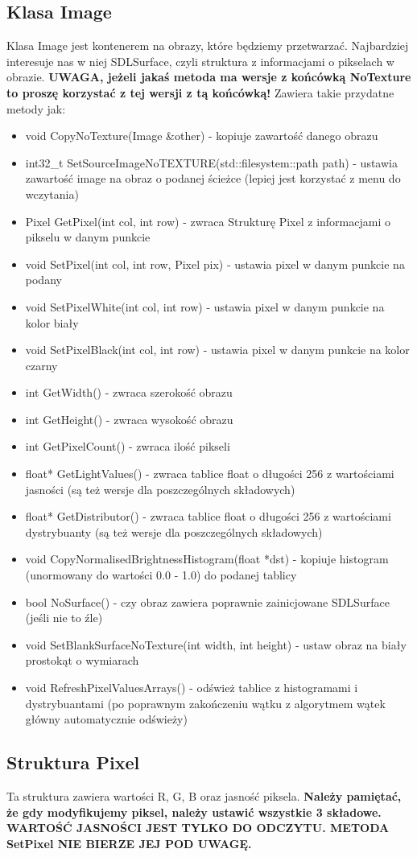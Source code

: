 \documentclass{article}
\begin{document}
\subsection{Klasa Image}
Klasa Image jest kontenerem na obrazy, które będziemy przetwarzać.
\newline
Najbardziej interesuje nas w niej SDLSurface, czyli struktura z informacjami o pikselach w obrazie.
\newline
\textbf{UWAGA, jeżeli jakaś metoda ma wersje z końcówką NoTexture to proszę korzystać z tej wersji z tą końcówką!}
\newline
Zawiera takie przydatne metody jak:
\begin{itemize}
    \item void CopyNoTexture(Image \&other) - kopiuje zawartość danego obrazu
    \item int32\_t SetSourceImageNoTEXTURE(std::filesystem::path path) - ustawia zawartość image na obraz o podanej ścieżce (lepiej jest korzystać z menu do wczytania)
    \item Pixel GetPixel(int col, int row) - zwraca Strukturę Pixel z informacjami o pikselu w danym punkcie
    \item void SetPixel(int col, int row, Pixel pix) - ustawia pixel w danym punkcie na podany
    \item void SetPixelWhite(int col, int row) - ustawia pixel w danym punkcie na kolor biały
    \item void SetPixelBlack(int col, int row) - ustawia pixel w danym punkcie na kolor czarny
    \item int GetWidth() - zwraca szerokość obrazu
    \item int GetHeight() - zwraca wysokość obrazu
    \item int GetPixelCount() - zwraca ilość pikseli
    \item float* GetLightValues() - zwraca tablice float o długości 256 z wartościami jasności (są też wersje dla poszczególnych składowych)
    \item float* GetDistributor() - zwraca tablice float o długości 256 z wartościami dystrybuanty (są też wersje dla poszczególnych składowych)
    \item void CopyNormalisedBrightnessHistogram(float *dst) - kopiuje histogram (unormowany do wartości 0.0 - 1.0) do podanej tablicy
    \item bool NoSurface() - czy obraz zawiera poprawnie zainicjowane SDLSurface (jeśli nie to źle)
    \item void SetBlankSurfaceNoTexture(int width, int height) - ustaw obraz na biały prostokąt o wymiarach
    \item void RefreshPixelValuesArrays() - odśwież tablice z histogramami i dystrybuantami (po poprawnym zakończeniu wątku z algorytmem wątek główny automatycznie odświeży)

\end{itemize}

\subsection{Struktura Pixel}
Ta struktura zawiera wartości R, G, B oraz jasność piksela.
\newline
\textbf{Należy pamiętać, że gdy modyfikujemy piksel, należy ustawić wszystkie 3 składowe.}
\newline
\textbf{WARTOŚĆ JASNOŚCI JEST TYLKO DO ODCZYTU. METODA SetPixel NIE BIERZE JEJ POD UWAGĘ.}
\end{document}
